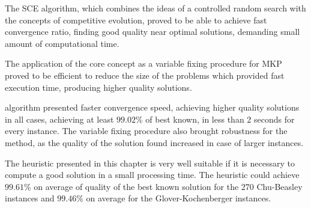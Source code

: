 The SCE algorithm, which combines the ideas of a controlled random search with
the concepts of competitive evolution, proved to be able to achieve fast
convergence ratio, finding good quality near optimal solutions, demanding small
amount of computational time.

The application of the core concept as a variable fixing procedure for MKP
proved to be efficient to reduce the size of the problems which provided fast
execution time, producing higher quality solutions.

\scecore algorithm presented faster convergence speed, achieving higher
quality solutions in all cases, achieving at least $99.02\%$ of best known, in less than $2$ seconds
for every instance.
The variable fixing procedure also brought robustness for the method, as the quality
of the solution found increased in case of larger instances.

The heuristic presented in this chapter is very well suitable if it is necessary
to compute a good solution in a small processing time.
The heuristic could achieve $99.61\%$ on average of quality of the best known solution for
the 270 Chu-Beasley instances and $99.46\%$ on average for the Glover-Kochenberger instances.
